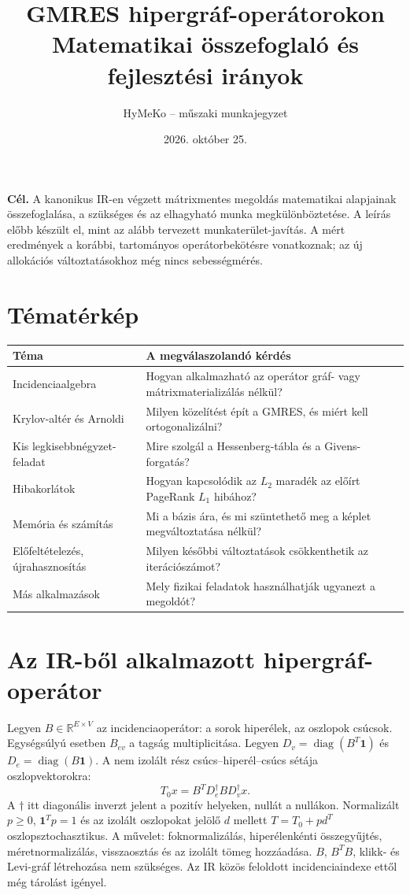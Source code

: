 \documentclass[11pt,a4paper]{article}
\title{GMRES hipergráf-operátorokon\\Matematikai összefoglaló és fejlesztési irányok}
\author{HyMeKo -- műszaki munkajegyzet}\date{2026. október 25.}
\begin{document}
\maketitle
\noindent\textbf{Cél.} A kanonikus IR-en végzett mátrixmentes megoldás matematikai
alapjainak összefoglalása, a szükséges és az elhagyható munka megkülönböztetése.
A leírás előbb készült el, mint az alább tervezett munkaterület-javítás. A mért
eredmények a korábbi, tartományos operátorbekötésre vonatkoznak; az új
allokációs változtatásokhoz még nincs sebességmérés.

\section*{Tématérkép}
\begin{tabularx}{\linewidth}{@{}lX@{}}\toprule
Téma & A megválaszolandó kérdés\\\midrule
Incidenciaalgebra & Hogyan alkalmazható az operátor gráf- vagy mátrixmaterializálás nélkül?\\
Krylov-altér és Arnoldi & Milyen közelítést épít a GMRES, és miért kell ortogonalizálni?\\
Kis legkisebbnégyzet-feladat & Mire szolgál a Hessenberg-tábla és a Givens-forgatás?\\
Hibakorlátok & Hogyan kapcsolódik az $L_2$ maradék az előírt PageRank $L_1$ hibához?\\
Memória és számítás & Mi a bázis ára, és mi szüntethető meg a képlet megváltoztatása nélkül?\\
Előfeltételezés, újrahasznosítás & Milyen későbbi változtatások csökkenthetik az iterációszámot?\\
Más alkalmazások & Mely fizikai feladatok használhatják ugyanezt a megoldót?\\\bottomrule
\end{tabularx}

\section{Az IR-ből alkalmazott hipergráf-operátor}
Legyen $B\in\mathbb R^{E\times V}$ az incidenciaoperátor: a sorok hiperélek,
az oszlopok csúcsok. Egységsúlyú esetben $B_{ev}$ a tagság multiplicitása.
Legyen $D_v=\operatorname{diag}(B^T\mathbf1)$ és
$D_e=\operatorname{diag}(B\mathbf1)$. A nem izolált rész csúcs--hiperél--csúcs
sétája oszlopvektorokra:
\[
 T_0x=B^T D_e^{\dagger}B D_v^{\dagger}x.
\]
A $\dagger$ itt diagonális inverzt jelent a pozitív helyeken, nullát a nullákon.
Normalizált $p\geq0$, $\mathbf1^Tp=1$ és az izolált oszlopokat jelölő $d$
mellett $T=T_0+p d^T$ oszlopsztochasztikus. A művelet: foknormalizálás,
hiperélenkénti összegyűjtés, méretnormalizálás, visszaosztás és az izolált tömeg
hozzáadása. $B$, $B^TB$, klikk- és Levi-gráf létrehozása nem szükséges.
Az IR közös feloldott incidenciaindexe ettől még tárolást igényel.
\end{document}
